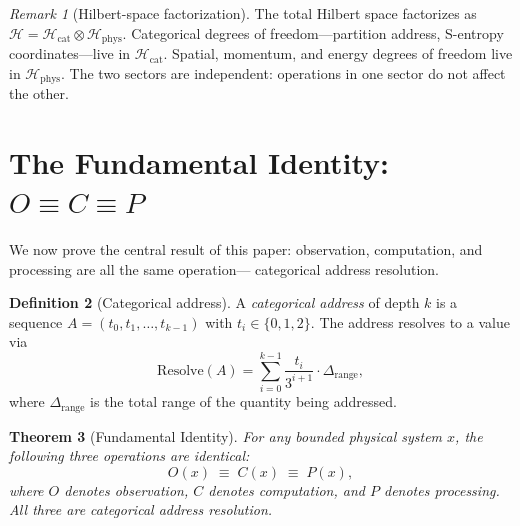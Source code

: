 \documentclass[10pt,twocolumn]{article}
\newtheorem{theorem}{Theorem}[section]
\theoremstyle{definition}
\newtheorem{definition}[theorem]{Definition}
\theoremstyle{remark}
\newtheorem{remark}[theorem]{Remark}
\newcommand{\Hil}{\mathcal{H}}
\begin{document}
\begin{remark}[Hilbert-space factorization]
The total Hilbert space factorizes as
$\Hil=\Hil_{\mathrm{cat}}\otimes\Hil_{\mathrm{phys}}$.
Categorical degrees of freedom---partition address, S-entropy
coordinates---live in $\Hil_{\mathrm{cat}}$.  Spatial,
momentum, and energy degrees of freedom live in
$\Hil_{\mathrm{phys}}$.  The two sectors are independent:
operations in one sector do not affect the other.
\end{remark}

\section{The Fundamental Identity: $O\equiv C\equiv P$}
\label{sec:OCP}

We now prove the central result of this paper: observation,
computation, and processing are all the same operation---
categorical address resolution.

\begin{definition}[Categorical address]\label{def:address}
A \emph{categorical address} of depth $k$ is a sequence
$A=(t_0,t_1,\dots,t_{k-1})$ with $t_i\in\{0,1,2\}$.  The
address resolves to a value via
\begin{equation}\label{eq:resolve}
  \mathrm{Resolve}(A) = \sum_{i=0}^{k-1}
  \frac{t_i}{3^{i+1}}\cdot\Delta_{\mathrm{range}},
\end{equation}
where $\Delta_{\mathrm{range}}$ is the total range of the
quantity being addressed.
\end{definition}

\begin{theorem}[Fundamental Identity]\label{thm:OCP}
For any bounded physical system $x$, the following three
operations are identical:
\begin{equation}\label{eq:OCP}
  O(x) \;\equiv\; C(x) \;\equiv\; P(x),
\end{equation}
where $O$ denotes observation, $C$ denotes computation, and $P$
denotes processing.  All three are categorical address
resolution.
\end{theorem}
\end{document}
